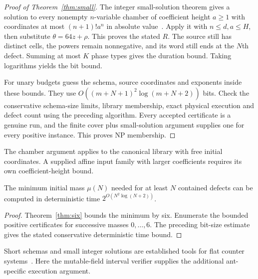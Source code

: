 \begin{proof}[Proof of Theorem~\ref{thm:small}]
The integer small-solution theorem gives a solution to every nonempty
$n$-variable chamber of coefficient height $a\ge1$ with coordinates at most
$(n+1)!a^n$ in absolute value~\cite{small}. Apply it with $n\le d,a\le H$,
then substitute $\theta=64z+\rho$. This proves the stated $R$.
The source still has distinct cells, the powers remain nonnegative, and its
word still ends at the $N$th defect. Summing at most $K$ phase types gives the
duration bound. Taking logarithms yields the bit bound.

For unary budgets guess the schema, source coordinates and exponents inside
these bounds. They use $O((m+N+1)^2\log(m+N+2))$ bits. Check the conservative
schema-size limits, library membership, exact physical execution and defect
count using the preceding algorithm. Every accepted certificate is a genuine
run, and the finite cover plus small-solution argument supplies one for every
positive instance. This proves NP membership.
\end{proof}
The chamber argument applies to the canonical library with free initial
coordinates. A supplied affine input family with larger coefficients requires
its own coefficient-height bound.

\begin{corollary}\label{cor:mu}
The minimum initial mass $\mu(N)$ needed for at least $N$ contained defects
can be computed in deterministic time $2^{O(N^2\log(N+2))}$.
\end{corollary}
\begin{proof}
Theorem~\ref{thm:six} bounds the minimum by six. Enumerate the bounded
positive certificates for successive masses $0,\ldots,6$. The preceding
bit-size estimate gives the stated conservative deterministic time bound.
\end{proof}
Short schemas and small integer solutions are established tools for flat
counter systems~\cite{demri}. Here the mutable-field interval verifier supplies
the additional ant-specific execution argument.
